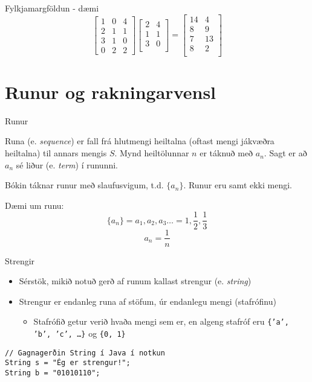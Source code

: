 \documentclass{beamer}
\begin{document}
\begin{frame}{Fylkjamargföldun - dæmi}
\[
\begin{bmatrix}
1&0&4\\2&1&1\\3&1&0\\0&2&2
\end{bmatrix}
\begin{bmatrix}
2&4\\
1&1\\
3&0\\
\end{bmatrix}
=
\begin{bmatrix}
14&4\\
8&9\\
7&13\\
8&2\\
\end{bmatrix}
\]

\end{frame}


\section{Runur og rakningarvensl}

\begin{frame}{Runur}
\begin{tcolorbox}[title=Runur]
Runa (e. \emph{sequence}) er fall frá hlutmengi heiltalna (oftast mengi jákvæðra heiltalna) til annars mengis $S$. Mynd heiltölunnar $n$ er táknuð með $a_n$. Sagt er að $a_n$ sé liður (e. \emph{term}) í rununni.
\end{tcolorbox}
Bókin táknar runur með slaufusvigum, t.d. $\{a_n\}$. Runur eru samt ekki mengi.

Dæmi um runu:
\[
 \{a_n\} = a_1, a_2, a_3 \ldots = 1, \frac{1}{2}, \frac{1}{3}
\]
\[
 a_n = \frac{1}{n}
\]
\end{frame}

\begin{frame}[fragile]{Strengir}
\begin{itemize}
 \item Sérstök, mikið notuð gerð af runum kallast strengur (e. \emph{string})
 \item Strengur er endanleg runa af stöfum, úr endanlegu mengi (stafrófinu)
 \begin{itemize}
  \item Stafrófið getur verið hvaða mengi sem er, en algeng stafróf eru \texttt{\{'a', 'b', 'c', \ldots\}} og \texttt{\{0, 1\}}
 \end{itemize}
\end{itemize}

\begin{verbatim}
// Gagnagerðin String í Java í notkun
String s = "Ég er strengur!";
String b = "01010110";
\end{verbatim}
\end{frame}
\end{document}
